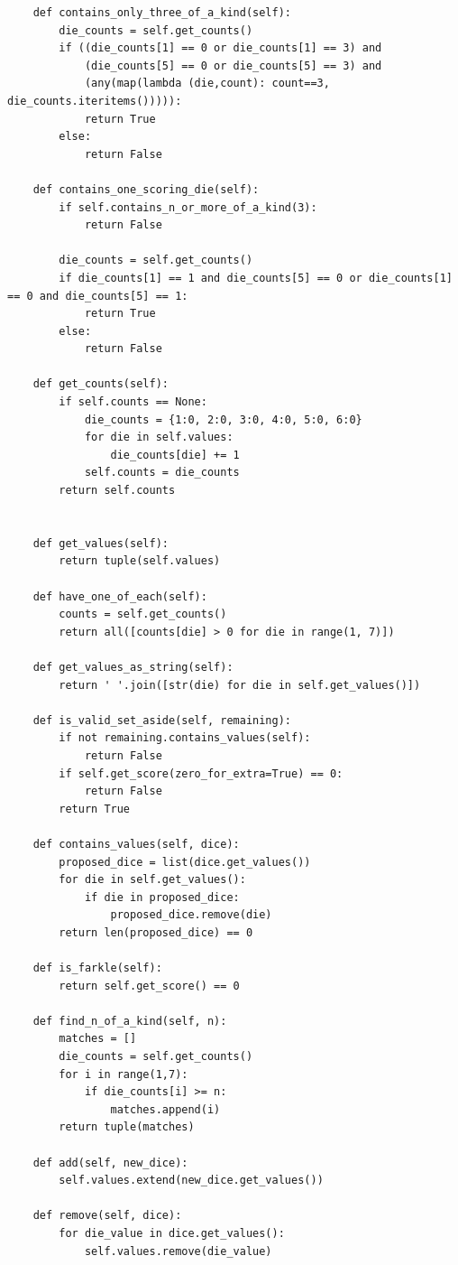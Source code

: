 \documentclass{article}
\begin{document}
\begin{verbatim}
    def contains_only_three_of_a_kind(self):
        die_counts = self.get_counts()
        if ((die_counts[1] == 0 or die_counts[1] == 3) and
            (die_counts[5] == 0 or die_counts[5] == 3) and 
            (any(map(lambda (die,count): count==3, die_counts.iteritems())))):
            return True
        else:
            return False

    def contains_one_scoring_die(self):
        if self.contains_n_or_more_of_a_kind(3):
            return False

        die_counts = self.get_counts()
        if die_counts[1] == 1 and die_counts[5] == 0 or die_counts[1] == 0 and die_counts[5] == 1:
            return True
        else:
            return False

    def get_counts(self):
        if self.counts == None:
            die_counts = {1:0, 2:0, 3:0, 4:0, 5:0, 6:0}
            for die in self.values:
                die_counts[die] += 1
            self.counts = die_counts
        return self.counts


    def get_values(self):
        return tuple(self.values)

    def have_one_of_each(self):
        counts = self.get_counts()
        return all([counts[die] > 0 for die in range(1, 7)])

    def get_values_as_string(self):
        return ' '.join([str(die) for die in self.get_values()])

    def is_valid_set_aside(self, remaining):
        if not remaining.contains_values(self):
            return False
        if self.get_score(zero_for_extra=True) == 0:
            return False
        return True

    def contains_values(self, dice):
        proposed_dice = list(dice.get_values())
        for die in self.get_values():
            if die in proposed_dice:
                proposed_dice.remove(die)
        return len(proposed_dice) == 0

    def is_farkle(self):
        return self.get_score() == 0

    def find_n_of_a_kind(self, n):
        matches = []
        die_counts = self.get_counts()
        for i in range(1,7):
            if die_counts[i] >= n:
                matches.append(i)
        return tuple(matches)

    def add(self, new_dice):
        self.values.extend(new_dice.get_values())

    def remove(self, dice):
        for die_value in dice.get_values():
            self.values.remove(die_value)


\end{verbatim}
\end{document}
